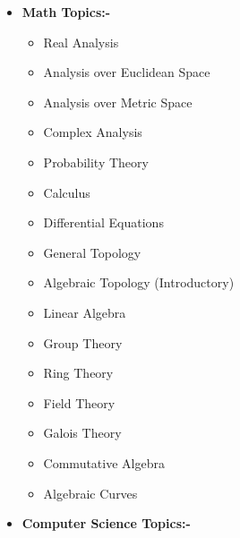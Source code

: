 \documentclass[10pt,a4paper,sans,colorlinks]{moderncv}        %
\begin{document}
\begin{itemize}
	\item 	\textbf{Math Topics:-}
 \begin{multicols}{2}
			      	\begin{itemize}
			      		\item Real Analysis
			      		\item Analysis over Euclidean Space
			      		\item Analysis over Metric Space
			      		 \item {Complex Analysis}
			      		  \item {Probability Theory}
			      		 
			      		 
			      		 \item {Calculus}
			      		 \item {Differential Equations}
			      \item {General Topology}
			       \item {Algebraic Topology (Introductory)}
			     
			     
			     \columnbreak
			     \item Linear Algebra
			     \item Group Theory
			     \item Ring Theory
			     \item Field Theory 
			     \item Galois Theory
			     \item {Commutative Algebra}
			     \item {Algebraic Curves}
			   
			      
	      \end{itemize}
			      \end{multicols}
	\item \textbf{Computer Science Topics:-}
	      \begin{itemize}



\end{itemize}
\end{itemize}
\end{document}

